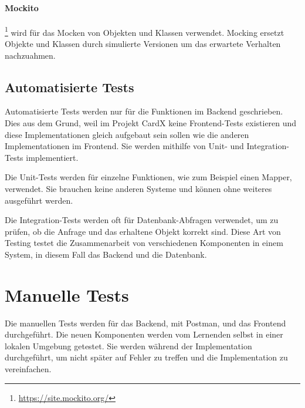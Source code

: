 \paragraph{Mockito} \footnote{\url{https://site.mockito.org/}} wird für das Mocken von Objekten und Klassen verwendet. Mocking ersetzt Objekte und Klassen durch simulierte Versionen um das erwartete Verhalten nachzuahmen.

\subsection{Automatisierte Tests}
Automatisierte Tests werden nur für die Funktionen im Backend geschrieben. Dies aus dem Grund, weil im Projekt CardX keine Frontend-Tests existieren und diese Implementationen gleich aufgebaut sein sollen wie die anderen Implementationen im Frontend. Sie werden mithilfe von Unit- und Integration-Tests implementiert.

Die Unit-Tests werden für einzelne Funktionen, wie zum Beispiel einen Mapper, verwendet. Sie brauchen keine anderen Systeme und können ohne weiteres ausgeführt werden.

Die Integration-Tests werden oft für Datenbank-Abfragen verwendet, um zu prüfen, ob die Anfrage und das erhaltene Objekt korrekt sind. Diese Art von Testing testet die Zusammenarbeit von verschiedenen Komponenten in einem System, in diesem Fall das Backend und die Datenbank.

\section{Manuelle Tests}
Die manuellen Tests werden für das Backend, mit Postman, und das Frontend durchgeführt. Die neuen Komponenten werden vom Lernenden selbst in einer lokalen Umgebung getestet. Sie werden während der Implementation durchgeführt, um nicht später auf Fehler zu treffen und die Implementation zu vereinfachen.



\newpage